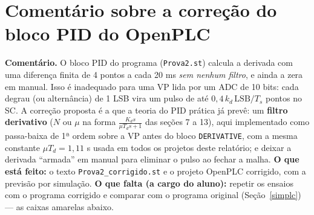 \section{Comentário sobre a correção do bloco PID do OpenPLC}\label{progcorr}
\textbf{Comentário.} O bloco PID do programa (\texttt{Prova2.st}) calcula a derivada com uma diferença finita de 4 pontos a cada 20 ms \emph{sem nenhum filtro}, e ainda a zera em manual. Isso é inadequado para uma VP lida por um ADC de 10 bits: cada degrau (ou alternância) de 1 LSB vira um pulso de até $0{,}4\,k_d\,\mathrm{LSB}/T_s$ pontos no SC. A correção proposta é a que a teoria do PID prática já prevê: um \textbf{filtro derivativo} ($N$ ou $\mu$ na forma $\frac{K_ds}{\mu T_ds+1}$ das seções 7 a 13), aqui implementado como passa-baixa de 1ª ordem sobre a VP antes do bloco \texttt{DERIVATIVE}, com a mesma constante $\mu T_d=1{,}11$ s usada em todos os projetos deste relatório; e deixar a derivada ``armada'' em manual para eliminar o pulso ao fechar a malha. \textbf{O que está feito:} o texto \texttt{Prova2\_corrigido.st} e o projeto OpenPLC corrigido, com a previsão por simulação. \textbf{O que falta (a cargo do aluno):} repetir os ensaios com o programa corrigido e comparar com o programa original (Seção~\ref{simplc}) --- as caixas amarelas abaixo.
